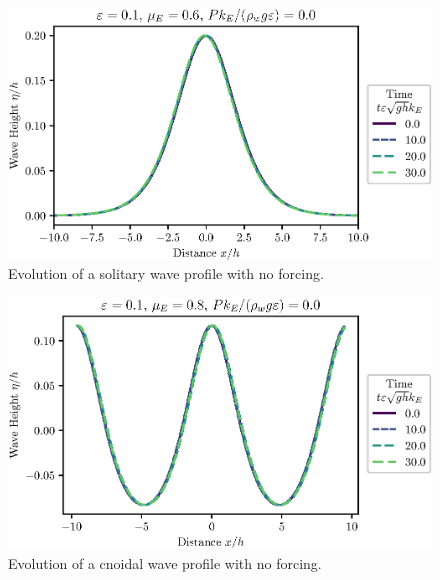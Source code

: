 \documentclass{jfm}
\begin{document}
\begin{figure}
  \centering
  \includegraphics{Long-Run-noH.eps}
  \caption{
    Evolution of a solitary wave profile with no forcing.
  }
\end{figure}

\begin{figure}
  \centering
  \includegraphics{Long-Run-Cnoidal-noH.eps}
  \caption{
    Evolution of a cnoidal wave profile with no forcing.
  }
\end{figure}
\end{document}
